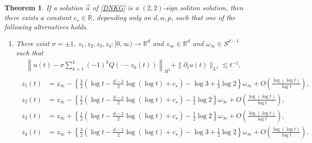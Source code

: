 \documentclass[reqno]{amsart}
\theoremstyle{plain}
\newtheorem{theorem}{Theorem}[section]
\theoremstyle{definition}
\numberwithin{equation}{section}
\begin{document}
\begin{theorem}\label{maintheorem}
If a solution $\vec{u}$ of \eqref{DNKG} is a $(2,2)$-sign soliton solution, then there exists a constant $c_{\star}\in \mathbb{R}$, depending only on $d,\alpha,p$, such that one of the following alternatives holds.
\begin{enumerate}
\item There exist $\sigma=\pm 1$, $z_1,z_2,z_3,z_4:[0,\infty)\to\mathbb{R}^d$ and $z_{\infty}\in\mathbb{R}^d$ and  $\omega_{\infty}\in S^{d-1}$ such that 
\begin{align}\label{4linetheorem1}
\left\| u(t)-\sigma \sum_{k=1}^4 (-1)^kQ(\cdot-z_k(t))\right\|_{H^1}+\|{\partial}_tu(t)\|_{L^2}\lesssim t^{-1},
\end{align}
\begin{align}\label{4linetheorem2}
\begin{aligned}
z_1(t)&=z_{\infty}-\left\{\frac{3}{2}\left(\log{t}-\frac{d-1}{2}\log{(\log{t})}+c_{\star}\right)-\log{3}+\frac{1}{2}\log{2} \right\}\omega_{\infty}+O\left(\frac{\log{(\log{t})}}{\log{t}}\right),
\\
z_2(t)&=z_{\infty}-\left\{\frac{1}{2}\left(\log{t}-\frac{d-1}{2}\log{(\log{t})}+c_{\star}\right)-\frac{1}{2}\log{2} \right\}\omega_{\infty}+O\left(\frac{\log{(\log{t})}}{\log{t}}\right),
\\
z_3(t)&=z_{\infty}+\left\{\frac{1}{2}\left(\log{t}-\frac{d-1}{2}\log{(\log{t})}+c_{\star}\right)-\frac{1}{2}\log{2} \right\}\omega_{\infty}+O\left(\frac{\log{(\log{t})}}{\log{t}}\right),
\\
z_4(t)&=z_{\infty}+\left\{\frac{3}{2}\left(\log{t}-\frac{d-1}{2}\log{(\log{t})}+c_{\star}\right)-\log{3}+\frac{1}{2}\log{2} \right\}\omega_{\infty}+O\left(\frac{\log{(\log{t})}}{\log{t}}\right).
\end{aligned}
\end{align}



\end{enumerate}
\end{theorem}
\end{document}
